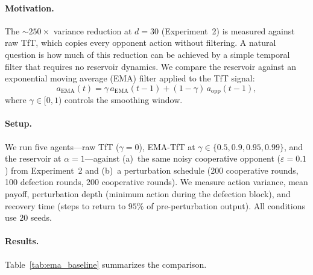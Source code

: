 \documentclass[11pt,a4paper]{article}
\theoremstyle{definition}
\begin{document}
\paragraph{Motivation.}
The $\sim 250\times$ variance reduction at $d = 30$
(Experiment~2) is measured against raw TfT, which copies every opponent
action without filtering.  A natural question is how much of this reduction
can be achieved by a simple temporal filter that requires no reservoir
dynamics.  We compare the reservoir against an exponential moving average
(EMA) filter applied to the TfT signal:
\begin{equation}
\label{eq:ema_tft}
a_{\mathrm{EMA}}(t) = \gamma \, a_{\mathrm{EMA}}(t-1) + (1-\gamma) \, a_{\mathrm{opp}}(t-1),
\end{equation}
where $\gamma \in [0, 1)$ controls the smoothing window.

\paragraph{Setup.}
We run five agents---raw TfT ($\gamma = 0$), EMA-TfT at
$\gamma \in \{0.5, 0.9, 0.95, 0.99\}$, and the reservoir at $\alpha = 1$---against
(a)~the same noisy cooperative opponent ($\varepsilon = 0.1$) from Experiment~2 and
(b)~a perturbation schedule (200 cooperative rounds, 100 defection rounds,
200 cooperative rounds).  We measure action variance, mean payoff,
perturbation depth (minimum action during the defection block), and recovery
time (steps to return to $95\%$ of pre-perturbation output).  All conditions
use $20$ seeds.

\paragraph{Results.}
Table~\ref{tab:ema_baseline} summarizes the comparison.
\end{document}
